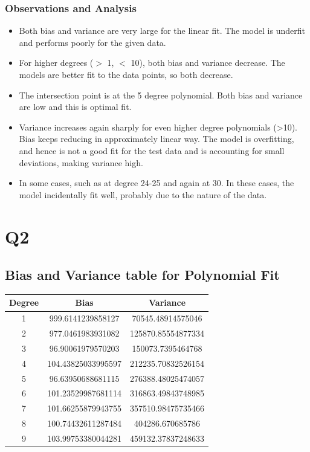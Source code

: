 \documentclass{article}
\begin{document}
\subsubsection{Observations and Analysis}
\begin{itemize}
\item Both bias and variance are very large for the linear fit. The model is underfit and performs poorly for the given data.
\item For higher degrees ($>$ 1, $<$ 10), both bias and variance decrease. The models are better fit to the data points, so both decrease.
\item The intersection point is at the 5 degree polynomial. Both bias and variance are low and this is optimal fit.
\item Variance increases again sharply for even higher degree polynomials (>10). Bias keeps reducing in approximately linear way. The model is overfitting, and hence is not a good fit for the test data and is accounting for small deviations, making variance high. 
\item In some cases, such as at degree 24-25 and again at 30. In these cases, the model incidentally fit well, probably due to the nature of the data.
\end{itemize}

\section{Q2}
\subsection{Bias and Variance table for Polynomial Fit}
\begin{center}
\begin{tabular}{ | c | c | c | }
\hline
Degree & Bias & Variance \\ 
\hline \hline
1 & 999.6141239858127 & 70545.48914575046 \\ 
\hline
2 & 977.0461983931082 & 125870.85554877334 \\ 
\hline
3 & 96.90061979570203 & 150073.7395464768 \\ 
\hline
4 & 104.43825033995597 & 212235.70832526154 \\ 
\hline
5 & 96.63950688681115 & 276388.48025474057 \\ 
\hline
6 & 101.23529987681114 & 316863.49843748985 \\ 
\hline
7 & 101.66255879943755 & 357510.98475735466 \\ 
\hline
8 & 100.74432611287484 & 404286.670685786 \\ 
\hline
9 & 103.99753380044281 & 459132.37837248633 \\ 
\hline
\end{tabular}
\end{center}
\end{document}
